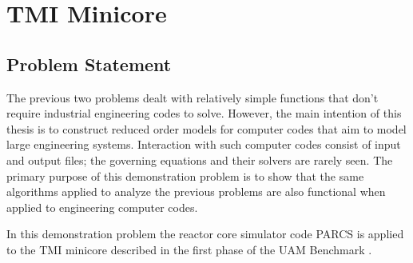 \section{\ac{TMI} Minicore}
\label{sec:tmi_minicore}

\subsection{Problem Statement}
\label{subsec:tmi_minicore_ps}

The previous two problems dealt with relatively simple functions that don't require industrial engineering codes to solve. However, the main intention of this thesis is to construct reduced order models for computer codes that aim to model large engineering systems. Interaction with such computer codes consist of input and output files; the governing equations and their solvers are rarely seen. The primary purpose of this demonstration problem is to show that the same algorithms applied to analyze the previous problems are also functional when applied to engineering computer codes.

In this demonstration problem the reactor core simulator code \ac{PARCS} \cite{PARCS} is applied to the \ac{TMI} minicore described in the first phase of the \ac{UAM} Benchmark \cite{UAM_Benchmark}.

